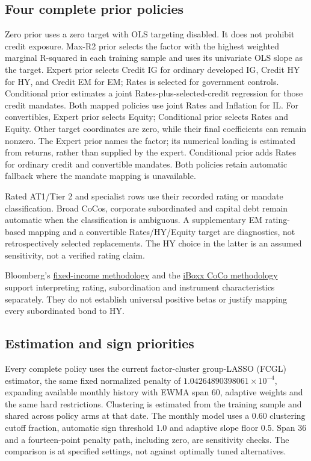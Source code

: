 \documentclass[a4paper,review]{cas-sc}
\begin{document}
\subsection{Four complete prior policies}

Zero prior uses a zero target with OLS targeting disabled. It does not prohibit credit exposure. Max-R2 prior selects the factor with the highest weighted marginal R-squared in each training sample and uses its univariate OLS slope as the target. Expert prior selects Credit IG for ordinary developed IG, Credit HY for HY, and Credit EM for EM; Rates is selected for government controls. Conditional prior estimates a joint Rates-plus-selected-credit regression for those credit mandates. Both mapped policies use joint Rates and Inflation for IL. For convertibles, Expert prior selects Equity; Conditional prior selects Rates and Equity. Other target coordinates are zero, while their final coefficients can remain nonzero. The Expert prior names the factor; its numerical loading is estimated from returns, rather than supplied by the expert. Conditional prior adds Rates for ordinary credit and convertible mandates. Both policies retain automatic fallback where the mandate mapping is unavailable.

Rated AT1/Tier 2 and specialist rows use their recorded rating or mandate classification. Broad CoCos, corporate subordinated and capital debt remain automatic when the classification is ambiguous. A supplementary EM rating-based mapping and a convertible Rates/HY/Equity target are diagnostics, not retrospectively selected replacements. The HY choice in the latter is an assumed sensitivity, not a verified rating claim.

Bloomberg's \href{https://data.bloomberglp.com/professional/sites/10/Bloomberg-Index-Publications-Fixed-Income-Index-Methodology.pdf}{fixed-income methodology} and the \href{https://www.spglobal.com/spdji/en/documents/methodologies/methodology-iboxx-contingent-convertible.pdf}{iBoxx CoCo methodology} support interpreting rating, subordination and instrument characteristics separately. They do not establish universal positive betas or justify mapping every subordinated bond to HY.

\subsection{Estimation and sign priorities}

Every complete policy uses the current factor-cluster group-LASSO (FCGL) estimator, the same fixed normalized penalty of $1.04264890398061\times10^{-4}$, expanding available monthly history with EWMA span 60, adaptive weights and the same hard restrictions. Clustering is estimated from the training sample and shared across policy arms at that date. The monthly model uses a 0.60 clustering cutoff fraction, automatic sign threshold 1.0 and adaptive slope floor 0.5. Span 36 and a fourteen-point penalty path, including zero, are sensitivity checks. The comparison is at specified settings, not against optimally tuned alternatives.
\end{document}
